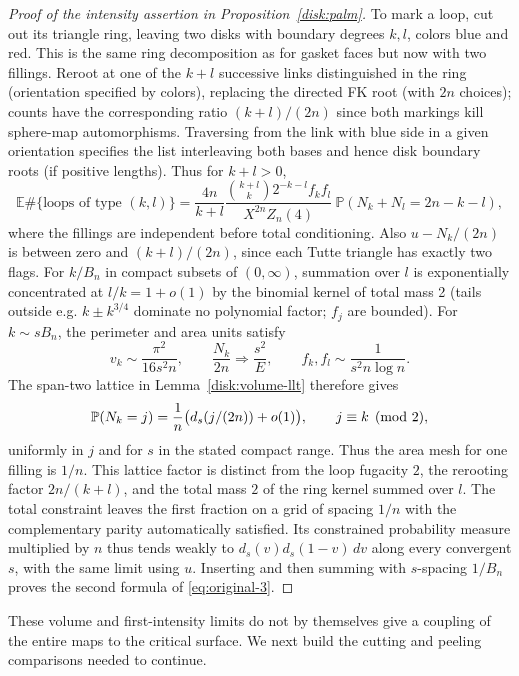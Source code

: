 \begin{proof}[Proof of the intensity assertion in Proposition~\ref{disk:palm}]

To mark a loop, cut out its triangle ring, leaving two disks with boundary degrees \(k,l\), colors blue and red.
This is the same ring decomposition as for gasket faces but now with two fillings.
Reroot at one of the \(k+l\) successive links distinguished in the ring (orientation specified by colors), replacing the directed FK root (with \(2n\) choices); counts have the corresponding ratio \((k+l)/(2n)\) since both markings kill sphere-map automorphisms.
Traversing from the link with blue side in a given orientation specifies the list interleaving both bases and hence disk boundary roots (if positive lengths).
Thus for \(k+l>0\),
\[
 \mathbb E\#\{\text{loops of type }(k,l)\}=
 \frac{4n}{k+l}\frac{\binom{k+l}{k}2^{-k-l} f_k f_l}{X^{2n}Z_n(4)}
 \ \mathbb P(N_k+N_l=2n-k-l),
\]
where the fillings are independent before total conditioning.
Also \(u-N_k/(2n)\) is between zero and \((k+l)/(2n)\), since each Tutte triangle has exactly two flags.
For \(k/B_n\) in compact subsets of \((0,\infty)\), summation over \(l\) is exponentially concentrated at \(l/k=1+o(1)\) by the binomial kernel of total mass 2 (tails outside e.g. \(k\pm k^{3/4}\) dominate no polynomial factor; \(f_j\) are bounded).
For $k\sim sB_n$, the perimeter and area units satisfy
\[
 v_k\sim\frac{\pi^2}{16s^2n},\qquad
 \frac{N_k}{2n}\Longrightarrow\frac{s^2}{E},\qquad
 f_k,f_l\sim\frac1{s^2n\log n}.
\]
The span-two lattice in Lemma~\ref{disk:volume-llt} therefore gives
\[
 \mathbb P(N_k=j)=\frac1n\bigl(d_s(j/(2n))+o(1)\bigr),
 \qquad j\equiv k\pmod2,
\]
uniformly in $j$ and for $s$ in the stated compact range.  Thus the area
mesh for one filling is $1/n$.  This lattice factor is distinct from the
loop fugacity $2$, the rerooting factor $2n/(k+l)$, and the total mass $2$
of the ring kernel summed over $l$.
The total constraint leaves the first fraction on a grid of spacing \(1/n\) with the complementary parity automatically satisfied.
Its constrained probability measure multiplied by \(n\) thus tends weakly to \(d_s(v)d_s(1-v)\,dv\) along every convergent \(s\), with the same limit using \(u\).
Inserting and then summing with \(s\)-spacing \(1/B_n\) proves the second formula of \eqref{eq:original-3}.

\end{proof}

These volume and first-intensity limits do not by themselves give a coupling of the entire maps to the critical surface.
We next build the cutting and peeling comparisons needed to continue.
